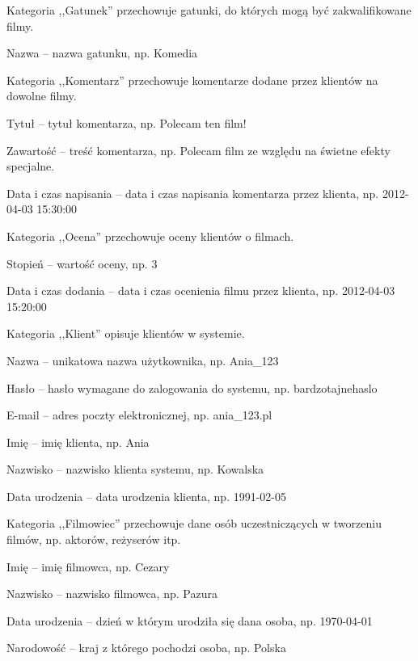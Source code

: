 \opis Kategoria ,,Gatunek'' przechowuje gatunki, do których mogą być zakwalifikowane filmy.
\begin{atrybuty}
    \item Nazwa -- nazwa gatunku, np. Komedia
\end{atrybuty}

\opis Kategoria ,,Komentarz'' przechowuje komentarze dodane przez klientów na dowolne filmy.
\begin{atrybuty}
    \item Tytuł -- tytuł komentarza, np. Polecam ten film!
    \item Zawartość -- treść komentarza, np. Polecam film ze względu na świetne efekty specjalne.
    \item Data i czas napisania -- data i czas napisania komentarza przez klienta, np. 2012-04-03 15:30:00
\end{atrybuty}

\opis Kategoria ,,Ocena'' przechowuje oceny klientów o filmach.
\begin{atrybuty}
    \item Stopień -- wartość oceny, np. 3
    \item Data i czas dodania -- data i czas ocenienia filmu przez klienta, np. 2012-04-03 15:20:00
\end{atrybuty}
	
\opis Kategoria ,,Klient'' opisuje klientów w systemie.
\begin{atrybuty}
    \item Nazwa -- unikatowa nazwa użytkownika, np. Ania\_123
    \item Hasło -- hasło wymagane do zalogowania do systemu, np. bardzotajnehaslo
	\item E-mail -- adres poczty elektronicznej, np. ania\_123\@poczta.pl
	\item Imię -- imię klienta, np. Ania
	\item Nazwisko -- nazwisko klienta systemu, np. Kowalska
	\item Data urodzenia -- data urodzenia klienta, np. 1991-02-05
\end{atrybuty}

\opis Kategoria ,,Filmowiec'' przechowuje dane osób uczestniczących w tworzeniu filmów, np. aktorów, reżyserów itp.
\begin{atrybuty}
    \item Imię -- imię filmowca, np. Cezary
    \item Nazwisko -- nazwisko filmowca, np. Pazura
    \item Data urodzenia -- dzień w którym urodziła się dana osoba, np. 1970-04-01
    \item Narodowość -- kraj z którego pochodzi osoba, np. Polska
\end{atrybuty}
